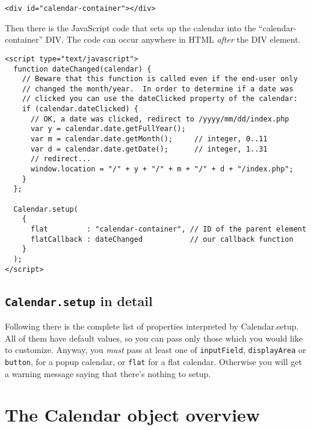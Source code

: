 \documentclass[a4paper,10pt]{article}
\begin{document}
\begin{verbatim}
<div id="calendar-container"></div>
\end{verbatim}

Then there is the JavaScript code that sets up the calendar into the
``calendar-container'' DIV.  The code can occur anywhere in HTML
\emph{after} the DIV element.

\begin{verbatim}
<script type="text/javascript">
  function dateChanged(calendar) {
    // Beware that this function is called even if the end-user only
    // changed the month/year.  In order to determine if a date was
    // clicked you can use the dateClicked property of the calendar:
    if (calendar.dateClicked) {
      // OK, a date was clicked, redirect to /yyyy/mm/dd/index.php
      var y = calendar.date.getFullYear();
      var m = calendar.date.getMonth();     // integer, 0..11
      var d = calendar.date.getDate();      // integer, 1..31
      // redirect...
      window.location = "/" + y + "/" + m + "/" + d + "/index.php";
    }
  };

  Calendar.setup(
    {
      flat         : "calendar-container", // ID of the parent element
      flatCallback : dateChanged           // our callback function
    }
  );
</script>
\end{verbatim}

\subsection{\texttt{Calendar.setup} in detail}\label{sec:Calendar.setup}

Following there is the complete list of properties interpreted by
Calendar.setup.  All of them have default values, so you can pass only those
which you would like to customize.  Anyway, you \emph{must} pass at least one
of \texttt{inputField}, \texttt{displayArea} or \texttt{button}, for a popup
calendar, or \texttt{flat} for a flat calendar.  Otherwise you will get a
warning message saying that there's nothing to setup.

\begin{small}
\ifx\shipout\undefined

\else
{}
\fi
\end{small}




\section{The Calendar object overview}\label{sec:Calendar_overview}
\end{document}
